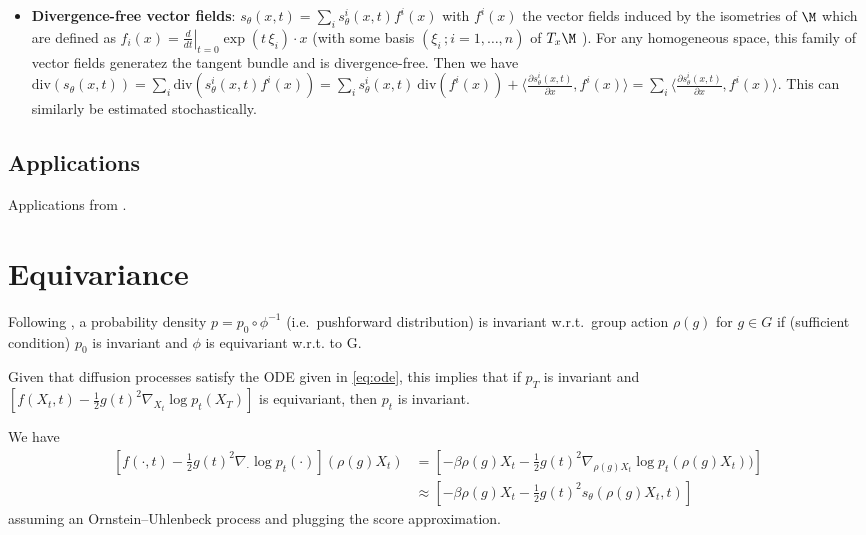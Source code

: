 \begin{itemize}
    \item \textbf{Divergence-free vector fields}: $s_\theta(x, t) = \sum_i s^i_\theta(x, t) f^i(x)$  with $f^i(x)$ the vector fields induced by the isometries of $\M$ which are defined as $f_i(x) = \left.\frac{d}{dt}\right|_{t=0} \exp(t\,\xi_i)\cdot x$ (with some basis $(\xi_i\,;i=1,\ldots,n)$ of $T_{x}\M$ ). For any homogeneous space, this family of vector fields generatez the tangent bundle and is divergence-free.
    Then we have $\text{div}(s_\theta(x, t)) = \sum_i \text{div}(s^i_\theta(x, t) f^i(x)) = \sum_i s^i_\theta(x, t) ~\text{div}(f^i(x)) + \langle \frac{\partial s^i_\theta(x, t)}{\partial x}, f^i(x)\rangle =  \sum_i \langle \frac{\partial s^i_\theta(x, t)}{\partial x}, f^i(x)\rangle$.
    This can similarly be estimated stochastically.
\end{itemize}


\subsection{Applications}
Applications from \cite{mathieu2020riemannian,cohen2021riemannian,rezende2020Normalizing,rezende2021Implicit,falorsi2021Continuous}.


\section{Equivariance}
Following \cite{kohler2020Equivariant}, a probability density $p=p_0\circ\phi^{-1}$ (i.e.\ pushforward distribution) is invariant w.r.t.\ group action $\rho(g)$ for $g \in G$ if (sufficient condition) $p_0$ is invariant and $\phi$ is equivariant w.r.t. to G.

Given that diffusion processes satisfy the ODE given in \cref{eq:ode}, this implies that if $p_T$ is invariant and $\left[ f(X_t, t) - \frac{1}{2} g(t)^2 \nabla_{X_t} \log p_t(X_T) \right]$ is equivariant, then $p_t$ is invariant.

We have
\begin{align}
\left[f(\cdot, t) - \frac{1}{2} g(t)^2 \nabla_{\cdot} \log p_t(\cdot) \right] \left(\rho(g) X_t \right) 
&= \left[- \beta \rho(g) X_t  - \frac{1}{2} g(t)^2  \nabla_{\rho(g) X_t} \log p_t\left(\rho(g) X_t\right)) \right] \\
& \approx \left[- \beta \rho(g) X_t - \frac{1}{2} g(t)^2 s_\theta\left(\rho(g) X_t, t\right) \right]
\end{align}
assuming an Ornstein–Uhlenbeck process and plugging the score approximation.

